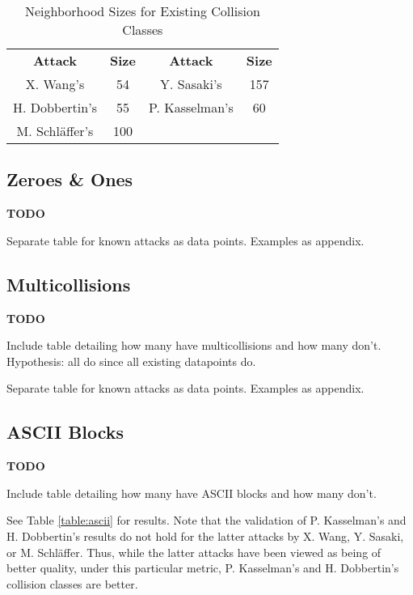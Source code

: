 \documentclass[conference]{IEEEtran}
\begin{document}
\begin{table}
    \caption{Neighborhood Sizes for Existing Collision Classes}
    \label{table:neighborhood}
    \begin{tabular}{c c c c}
        \textbf{Attack} & \textbf{Size} & \textbf{Attack} & \textbf{Size} \\
        X. Wang's & 54 & Y. Sasaki's & 157 \\
        H. Dobbertin's & 55 & P. Kasselman's & 60 \\
        M. Schl{\"a}ffer's & 100 & & \\
    \end{tabular}
\end{table}


\subsection{Zeroes \& Ones}

\textbf{TODO}

Separate table for known attacks as data points. Examples as appendix.




\subsection{Multicollisions}

\textbf{TODO}

Include table detailing how many have multicollisions and how many don't.
Hypothesis: all do since all existing datapoints do.

Separate table for known attacks as data points. Examples as appendix.


\subsection{ASCII Blocks}

\textbf{TODO}

Include table detailing how many have ASCII blocks and how many don't.

See Table \ref{table:ascii} for results. Note that the validation of
P. Kasselman's and H. Dobbertin's results do not hold for the latter attacks
by X. Wang, Y. Sasaki, or M. Schl{\"a}ffer. Thus, while the latter attacks have
been viewed as being of better quality, under this particular metric,
P. Kasselman's and H. Dobbertin's collision classes are better.
\end{document}
